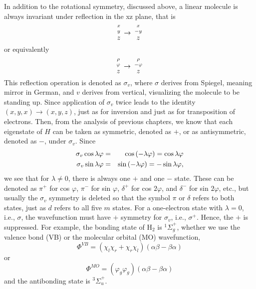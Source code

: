In addition to the rotational symmetry, discussed above, a linear 
molecule is always invariant under reflection in the xz plane, that is
\begin{equation}
{{x \atop y} \atop z} \rightarrow {{x \atop -y} \atop z}
\label{chap10-eqno13a}
\end{equation}
or equivalently
\begin{equation}
{{\rho \atop \varphi} \atop z} \rightarrow 
{{\rho \atop - \varphi} \atop z}
\label{chap10-eqno13b}
\end{equation}
This reflection operation is denoted as $\sigma_v$, where $\sigma$ derives from 
Spiegel, meaning mirror in German, and $v$ derives from vertical, 
visualizing the molecule to be standing up. Since application 
of $\sigma_v$ twice leads to the identity $(x,y,x) \rightarrow 
(x,y,z)$, just as 
for inversion and just as for transposition of electrons.  Then, 
from the analysis of previous chapters, we know that each 
eigenstate of $H$ can be taken as symmetric, denoted as $+$, or as 
antisymmetric, denoted as $-$, under $\sigma_v$.  Since
\begin{eqnarray}
\sigma_v \cos \lambda \varphi &=& \cos \left( - \lambda \varphi 
\right) = \cos \lambda \varphi\cr
\sigma_v \sin \lambda \varphi &=& \sin \left( - \lambda \varphi 
\right) = -\sin \lambda \varphi,
\end{eqnarray}
we see that for $\lambda \not= 0$, there is always one $+$ and one $-$ 
state. These can be denoted as $\pi^+$ for cos $\varphi$, $\pi^-$ for sin 
$\varphi$, $\delta^+$ for cos $2 \varphi$, and $\delta^-$ for sin $2 
\varphi$, etc., but usually the $\sigma_v$ symmetry is deleted so 
that the symbol $\pi$ or $\delta$ 
refers to both states, just as $d$ refers to all five $m$ states. For a 
one-electron state with $\lambda = 0$, i.e., $\sigma$, the wavefunction 
must have $+$ symmetry for $\sigma_v$, i.e., $\sigma^+$.  Hence, 
the $+$ is suppressed.  For example, the
bonding state of H$_2$ is ${^1\Sigma}^+_g$, whether we use the valence 
bond (VB) or the molecular orbital (MO) wavefunction,
\begin{equation}
\Phi^{VB} = \left( \chi_l \chi_r + \chi_r \chi_l \right) \left( 
\alpha \beta - \beta \alpha \right)
\end{equation}
or
\begin{equation}
\Phi^{MO} = \left( \varphi_g \varphi_g \right) \left( 
\alpha \beta - \beta \alpha \right)
\end{equation}
and the antibonding state is ${^3\Sigma}^+_u$.

